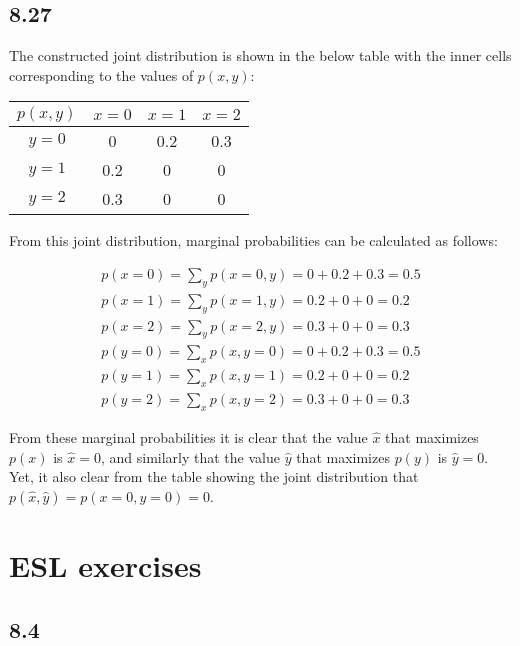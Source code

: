 \documentclass[a4paper, 12pt]{article}
\begin{document}

\subsection{8.27}

The constructed joint distribution is shown in the below table with the inner cells corresponding to the values of $p(x,y)$:

\begin{tabular}{c|ccc}
	$p(x,y)$ & $x=0$ & $x=1$ & $x=2$ \\
	\hline
	$y=0$ & 0 & 0.2 & 0.3 \\
	$y=1$ & 0.2 & 0 & 0 \\
	$y=2$ & 0.3 & 0 & 0 \\
\end{tabular}

From this joint distribution, marginal probabilities can be calculated as follows:

\begin{align}
	p(x=0) = \sum_y p(x=0,y) = 0 + 0.2 + 0.3 = 0.5\\
	p(x=1) = \sum_y p(x=1,y) = 0.2 + 0 + 0 = 0.2\\
	p(x=2) = \sum_y p(x=2,y) = 0.3 + 0 + 0 = 0.3\\
	p(y=0) = \sum_x p(x,y=0) = 0 + 0.2 + 0.3 = 0.5\\
	p(y=1) = \sum_x p(x,y=1) = 0.2 + 0 + 0 = 0.2\\
	p(y=2) = \sum_x p(x,y=2) = 0.3 + 0 + 0 = 0.3
\end{align}

From these marginal probabilities it is clear that the value $\hat{x}$ that maximizes $p(x)$ is $\hat{x}=0$, and similarly that the value $\hat{y}$ that maximizes $p(y)$ is $\hat{y}=0$. Yet, it also clear from the table showing the joint distribution that $p(\hat{x}, \hat{y}) = p(x=0, y=0) = 0$.

\section{ESL exercises}

\subsection{8.4}
\end{document}
